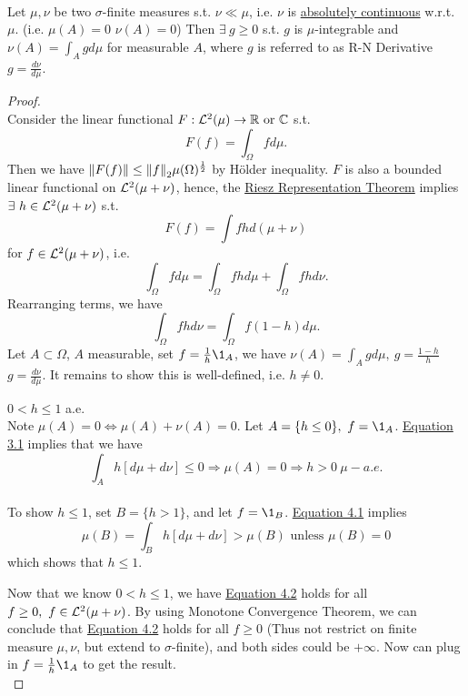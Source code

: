 \vspace{3pt}
\begin{theorem}\label{R-N thm}\ \\
Let $\mu,\nu$ be two $\sigma$-finite measures s.t. $\nu \ll \mu$, i.e. $\nu$ is \underline{absolutely continuous} w.r.t. $\mu$. (i.e. $\mu(A) = 0$ \imply $\nu(A) = 0$) Then $\exists\ g \geq 0$ s.t. $g$ is $\mu$-integrable and $\nu(A) = \int_A g d\mu$ for measurable $A$, where $g$ is referred to as R-N Derivative $g = \frac{d\nu}{d \mu}$.
\end{theorem}
\begin{proof}\ \\
Consider the linear functional $F: \mathcal{L}^2(\mu) \to \mathbb{R} \text{ or } \mathbb{C}$ s.t. 
\begin{equation*}
    F(f) = \int_\Omega f d\mu.
\end{equation*}
Then we have $\norm{F(f)} \leq \norm{f}_2 \mu(\Omega)^{\frac{1}{2}}$ by H\"older inequality. $F$ is also a bounded linear functional on $\mathcal{L}^2(\mu + \nu)$, hence, the \hyperref[RRT]{Riesz Representation Theorem} implies $\exists\ h \in \mathcal{L}^2(\mu+\nu)$ s.t.
$$F(f) = \int f h d(\mu+\nu)$$ 
for $f \in \mathcal{L}^2(\mu + \nu)$, i.e. 
\begin{equation}
    \int_\Omega f d\mu = \int_\Omega fh d\mu + \int_\Omega fh d\nu.\label{eq:4.1}
\end{equation} 
Rearranging terms, we have
\begin{equation}
    \int_\Omega fh d\nu = \int_\Omega f(1 - h) d\mu.\label{eq:4.2}
\end{equation} 
Let $A \subset \Omega$, $A$ measurable, set $f = \frac{1}{h} \1_A$, we have $\nu(A) = \int_A  g d\mu,\ g = \frac{1-h}{h}$ \imply $g = \frac{d\nu}{ d \mu}$. It remains to show this is well-defined, i.e. $h \neq 0$.
\begin{claim}
$0 < h \leq 1$ a.e. \\
Note $\mu(A) = 0 \Leftrightarrow \mu(A) + \nu(A) = 0$. Let $A = \{h \leq 0\},\ f = \1_A$. \hyperref[eq:3.1]{Equation 3.1} implies that we have 
\begin{equation*}
    \int_A h [d\mu + d\nu] \leq 0 \Rightarrow \mu(A) = 0 \Rightarrow h > 0\ \mu-a.e.
\end{equation*}\\
To show $h \leq 1$, set $B = \{h > 1\}$, and let $f = \1_B$. \hyperref[eq:4.1]{Equation 4.1} implies 
\begin{equation*}
    \mu(B) = \int_B h [d\mu + d\nu] > \mu(B) \text{ unless } \mu(B) = 0
\end{equation*}
which shows that $h \leq 1$.
\end{claim}
Now that we know $0 < h \leq 1$, we have \hyperref[eq:4.2]{Equation 4.2} holds for all $f \geq 0,\ f \in \mathcal{L}^2(\mu + \nu)$. By using Monotone Convergence Theorem, we can conclude that \hyperref[eq:4.2]{Equation 4.2} holds for all $f \geq 0$ (Thus not restrict on finite measure $\mu,\nu$, but extend to $\sigma$-finite), and both sides could be $+\infty$. Now can plug in $f = \frac{1}{h}\1_A$ to get the result.\\ 
\end{proof}
